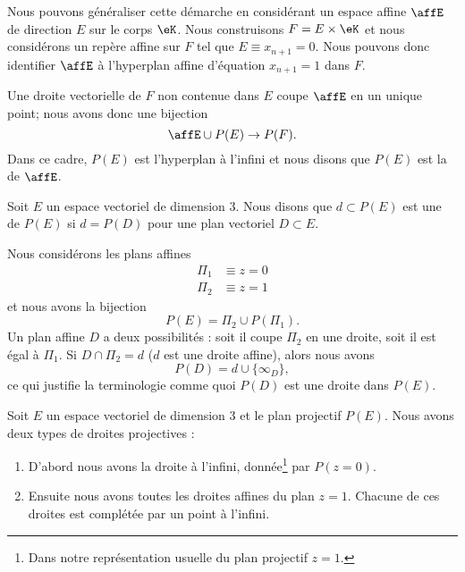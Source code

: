 Nous pouvons généraliser cette démarche en considérant un espace affine \( \affE\) de direction \( E\) sur le corps \( \eK\). Nous construisons \( F=E\times \eK\) et nous considérons un repère affine sur \( F\) tel que \( E\equiv x_{n+1}=0\). Nous pouvons donc identifier \( \affE\) à l'hyperplan affine d'équation \( x_{n+1}=1\) dans \( F\).

Une droite vectorielle de \( F\) non contenue dans \( E\) coupe \( \affE\) en un unique point; nous avons donc une bijection
\begin{equation}
    \affE\cup P(E)\to P(F).
\end{equation}
Dans ce cadre, \( P(E)\) est l'hyperplan à l'infini et nous disons que \( P(E)\) est la  de \( \affE\).

\begin{definition}
    Soit \( E\) un espace vectoriel de dimension \( 3\). Nous disons que \( d\subset P(E)\) est une  de \( P(E)\) si \( d=P(D)\) pour une plan vectoriel \( D\subset E\).
\end{definition}

\begin{example}
    Nous considérons les plans affines
    \begin{subequations}
        \begin{align}
            \Pi_1&\equiv z=0\\
            \Pi_2&\equiv z=1
        \end{align}
    \end{subequations}
    et nous avons la bijection
    \begin{equation}
        P(E)=\Pi_2\cup P(\Pi_1).
    \end{equation}
    Un plan affine \( D\) a deux possibilités : soit il coupe \( \Pi_2\) en une droite, soit il est égal à \( \Pi_1\). Si \( D\cap\Pi_2=d\) (\( d\) est une droite affine), alors nous avons
    \begin{equation}
        P(D)=d\cup\{ \infty_D \},
    \end{equation}
    ce qui justifie la terminologie comme quoi \( P(D)\) est une droite dans \( P(E)\).
\end{example}

Soit \( E\) un espace vectoriel de dimension \( 3\) et le plan projectif \( P(E)\). Nous avons deux types de droites projectives :
\begin{enumerate}
    \item
        D'abord nous avons la droite à l'infini, donnée\footnote{Dans notre représentation usuelle du plan projectif \( z=1\).} par \( P(z=0)\).
    \item
        Ensuite nous avons toutes les droites affines du plan \( z=1\). Chacune de ces droites est complétée par un point à l'infini. 
\end{enumerate}

